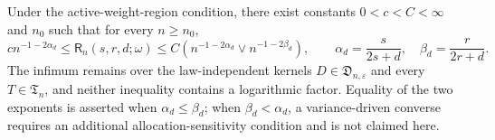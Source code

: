 Under the active-weight-region condition, there exist constants \(0<c<C<\infty\) and \(n_0\) such that for every \(n\geq n_0\),
\[
c n^{-1-2\alpha_d}
\leq\mathsf R_n(s,r,d;\omega)
\leq C\left(n^{-1-2\alpha_d}\vee n^{-1-2\beta_d}\right),
\qquad
\alpha_d=\frac{s}{2s+d},\quad
\beta_d=\frac{r}{2r+d}.
\]
The infimum remains over the law-independent kernels \(D\in\mathfrak D_{n,\varepsilon}\) and every \(T\in\mathfrak T_n\), and neither inequality contains a logarithmic factor.  Equality of the two exponents is asserted when \(\alpha_d\leq\beta_d\); when \(\beta_d<\alpha_d\), a variance-driven converse requires an additional allocation-sensitivity condition and is not claimed here.